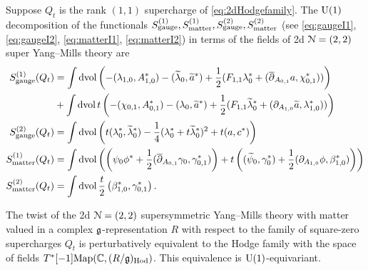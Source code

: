 \documentclass[10pt, oneside]{article}
\begin{document}
\begin{prop}
Suppose $Q_t$ is the rank $(1,1)$ supercharge of \eqref{eq:2dHodgefamily}.
The $\mathrm{U}(1)$ decomposition of the functionals $S_{\rm gauge}^{(1)}, S^{(1)}_{\rm matter}, S^{(2)}_{\rm gauge}, S^{(2)}_{\rm matter}$ (see \eqref{eq:gaugeI1},  \eqref{eq:gaugeI2}, \eqref{eq:matterI1}, \eqref{eq:matterI2}) in terms of the fields of 2d $\mathcal N=(2,2)$ super Yang--Mills theory are
\begin{align*}
S_{\rm gauge}^{(1)}(Q_t) &= \int \operatorname{dvol} \left(-(\lambda_{1,0}, A_{1,0}^*) - (\widetilde{\lambda}_0, \widetilde{a}^*) + \frac 12(F_{1,1} \lambda_0^* + (\overline{\partial}_{A_{0,1}}a, \chi_{0,1}^*)) \right)  \\
&+  \int \operatorname{dvol} t \left( -(\chi_{0,1}, A_{0,1}^*) - (\lambda_0, \widetilde{a}^*) + \frac 12(F_{1,1} \widetilde{\lambda}_0^*+ (\partial_{A_{1,0}} \widetilde{a}, \lambda_{1,0}^*) )   \right)  \\
S^{(2)}_{\rm gauge} (Q_t) &= \int \operatorname{dvol} \left(t (\lambda_0^*, \widetilde{\lambda}_0^*) - \frac 14(\lambda_0^* + t \widetilde{\lambda}_0^*)^2 + t(a, c^*)\right)  \\
S_{\rm matter}^{(1)}(Q_t) &= \int \operatorname{dvol} \left(\left( \psi_0 \phi^* + \frac 12 (\overline{\partial}_{A_{0,1}} \gamma_0, \gamma_{0,1}^*) \right) +t\left( (\widetilde{\psi}_0, \gamma_0^*) + \frac 12 (\partial_{A_{1,0}}  \phi, \beta_{1,0}^*)  \right)\right)  \\
S_{\rm matter}^{(2)}(Q_t) &= \int \operatorname{dvol} \frac t2 \left(\beta_{1,0}^*, \gamma_{0,1}^*\right).
\end{align*}
\end{prop}

\begin{theorem} \label{2d_2_A_twist_thm}
The twist of the 2d $\mathcal{N}=(2,2)$ supersymmetric Yang--Mills theory with matter valued in a complex $\mathfrak g$-representation $R$ with respect to the family of square-zero supercharges $Q_t$ is perturbatively equivalent to the Hodge family with the space of fields $T^*[-1]\mathrm{Map}(\mathbb C, (R/\mathfrak{g})_{\mathrm{Hod}})$.  
This equivalence is $\mathrm{U}(1)$-equivariant.
\end{theorem}
\end{document}

